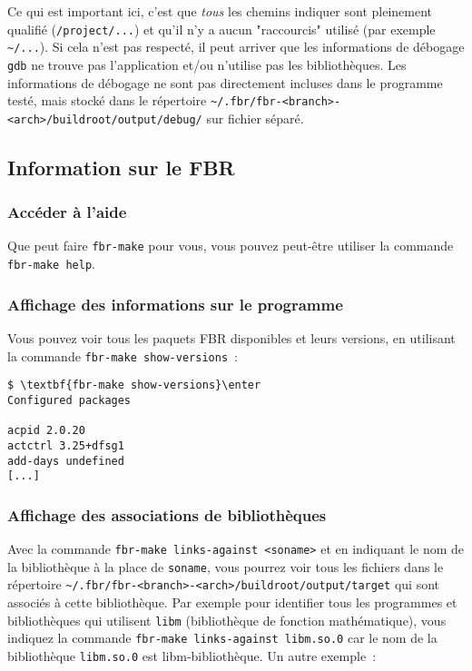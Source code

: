 Ce qui est important ici, c'est que \emph{tous} les chemins indiquer sont
pleinement qualifié (\texttt{/project/...}) et qu'il n'y a aucun "raccourcis"
utilisé (par exemple \texttt{\~{}/...}). Si cela n'est pas respecté, il
peut arriver que les informations de débogage \texttt{gdb} ne trouve pas
l'application et/ou n'utilise pas les bibliothèques. Les informations de débogage
ne sont pas directement incluses dans le programme testé, mais stocké dans le
répertoire \texttt{\~{}/.fbr/fbr-<branch>-<arch>/buildroot/output/debug/} sur fichier séparé.

\subsection{Information sur le FBR}

\subsubsection{Accéder à l'aide}

Que peut faire \texttt{fbr-make} pour vous, vous pouvez peut-être utiliser
la commande \texttt{fbr-make help}.

\subsubsection{Affichage des informations sur le programme}

Vous pouvez voir tous les paquets FBR disponibles et leurs versions, en
utilisant la commande \texttt{fbr-make show-versions}~:

\begin{example}
\begin{Verbatim}[commandchars=\\\{\}]
$ \textbf{fbr-make show-versions}\enter
Configured packages

acpid 2.0.20
actctrl 3.25+dfsg1
add-days undefined
[...]
\end{Verbatim}
\end{example}

\subsubsection{Affichage des associations de bibliothèques}

Avec la commande \texttt{fbr-make links-against <soname>} et en indiquant le nom
de la bibliothèque à la place de \texttt{soname}, vous pourrez voir tous les
fichiers dans le répertoire \texttt{\~{}/.fbr/fbr-<branch>-<arch>/buildroot/output/target}
qui sont associés à cette bibliothèque. Par exemple pour identifier tous les
programmes et bibliothèques qui utilisent \texttt{libm} (bibliothèque de fonction
mathématique), vous indiquez la commande \texttt{fbr-make links-against libm.so.0}
car le nom de la bibliothèque \texttt{libm.so.0} est libm-bibliothèque.
Un autre exemple~:

